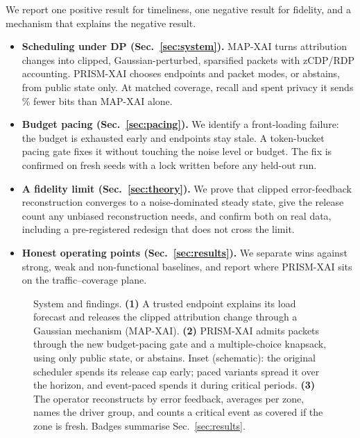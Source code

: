 \documentclass[conference]{IEEEtran}
\newcommand{\method}{PRISM-XAI}
\newcommand{\mapxai}{MAP-XAI}
\begin{document}
We report one positive result for timeliness, one negative result for fidelity,
and a mechanism that explains the negative result.
\begin{itemize}[leftmargin=*]
\item \textbf{Scheduling under DP (Sec.~\ref{sec:system}).} \mapxai{} turns
attribution changes into clipped, Gaussian-perturbed, sparsified packets with
zCDP/RDP accounting. \method{} chooses endpoints and packet modes, or abstains,
from public state only. At matched coverage, recall and spent privacy it sends
\mapTrafficRel\% fewer bits than \mapxai{} alone.
\item \textbf{Budget pacing (Sec.~\ref{sec:pacing}).} We identify a
front-loading failure: the budget is exhausted early and endpoints stay stale. A
token-bucket pacing gate fixes it without touching the noise level or budget.
The fix is confirmed on fresh seeds with a lock written before any held-out run.
\item \textbf{A fidelity limit (Sec.~\ref{sec:theory}).} We prove that clipped
error-feedback reconstruction converges to a noise-dominated steady state, give
the release count any unbiased reconstruction needs, and confirm both on real
data, including a pre-registered redesign that does not cross the limit.
\item \textbf{Honest operating points (Sec.~\ref{sec:results}).} We separate
wins against strong, weak and non-functional baselines, and report where
\method{} sits on the traffic--coverage plane.
\end{itemize}

\begin{figure}[t]
\centering
\resizebox{\textwidth}{!}{}
\caption{System and findings. \textbf{(1)} A trusted endpoint explains its load
forecast and releases the clipped attribution change through a Gaussian
mechanism (\mapxai{}). \textbf{(2)} \method{} admits packets through the new
budget-pacing gate and a multiple-choice knapsack, using only public state, or
abstains. Inset (schematic): the original scheduler spends its release cap early;
paced variants spread it over the horizon, and event-paced spends it during
critical periods. \textbf{(3)} The operator reconstructs by error feedback,
averages per zone, names the driver group, and counts a critical event as covered
if the zone is fresh. Badges summarise Sec.~\ref{sec:results}.}
\label{fig:concept}
\end{figure}

\end{document}
